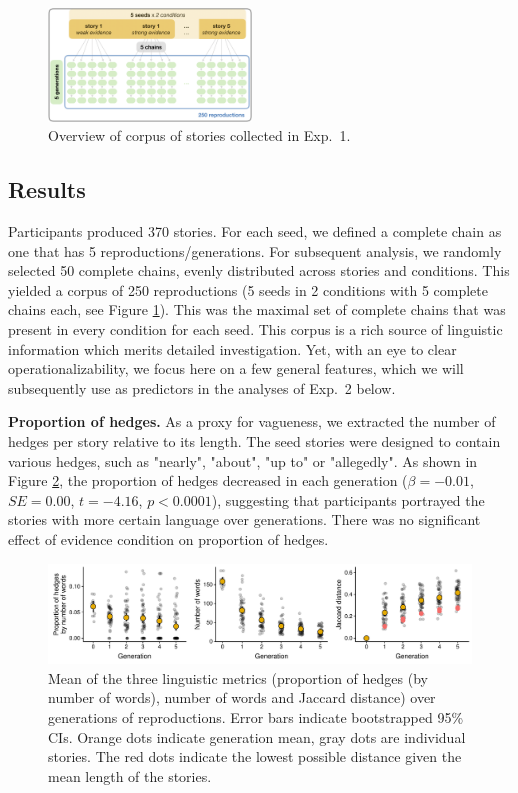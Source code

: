 \documentclass[10pt,letterpaper]{article}
\begin{document}
 \begin{figure}[]
	\includegraphics[width=0.48\textwidth]{pics/corpus_overview.png}
	\caption{Overview of corpus of stories collected in Exp.~1.} 
	\label{fig:design}
\end{figure}

\subsection{Results}

Participants produced 370 stories. For each seed, we defined a complete chain as one that has 5 reproductions/generations. For subsequent analysis, we randomly selected 50 complete chains, evenly distributed across stories and conditions. This yielded a corpus of 250 reproductions (5 seeds in 2 conditions with 5 complete chains each, see Figure \ref{fig:design}). This was the maximal set of complete chains that was present in every condition for each seed. This corpus is a rich source of linguistic information which merits detailed investigation. Yet, with an eye to clear operationalizability, we focus here on a few general features, which we will subsequently use as predictors in the analyses of Exp.~2 below.

\textbf{Proportion of hedges.} As a proxy for vagueness, we extracted the number of hedges per story relative to its length. The seed stories were designed to contain various hedges, such as "nearly", "about", "up to" or "allegedly". As shown in Figure \ref{fig:corpusLingMetrics}, the proportion of hedges decreased in each generation  ($\beta = -0.01$, $SE = 0.00$, $t = -4.16$, $p < 0.0001$), suggesting that participants portrayed the stories with more certain language over generations. There was no significant effect of evidence condition on proportion of hedges.

\begin{figure}[]
\centering
	\includegraphics[width=.85\textwidth]{pics/linmeasure_grid}
	\caption{Mean of the three linguistic metrics (proportion of hedges (by number of words), number of words and Jaccard distance) over generations of reproductions. Error bars indicate bootstrapped 95\% CIs. Orange dots indicate generation mean, gray dots are individual stories. The red dots indicate the lowest possible distance given the mean length of the stories.} 
	\label{fig:corpusLingMetrics}
\end{figure}
\end{document}
